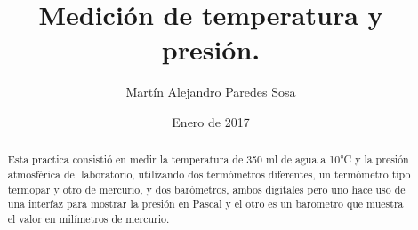 \documentclass[12pt]{article}
\title{Medición de temperatura y presión.}
\author{Martín Alejandro Paredes Sosa}
\date{Enero de 2017}
\makeatletter
\let\thetitle\@title
\let\theauthor\@author
\let\thedate\@date
\makeatother
\begin{document}
\begin{center}
{ \large \bfseries \thetitle}\\
\end{center}
	\begin{minipage}{\textwidth}
		\begin{center} 
			\large\theauthor 
			\end{center}
	\end{minipage}\\[0.2 cm]
	
	\begin{center}
	\thedate\\
	\end{center}%
 
	
\begin{abstract}
	Esta practica consistió en medir la temperatura de 350 ml de agua a 10°C y la presión atmosférica del laboratorio, utilizando dos termómetros diferentes, un termómetro tipo termopar y otro de mercurio, y dos barómetros, ambos digitales pero uno hace uso de una interfaz para mostrar la presión en Pascal y el otro es un barometro que muestra el valor en milímetros de mercurio.
\end{abstract}
\end{document}
